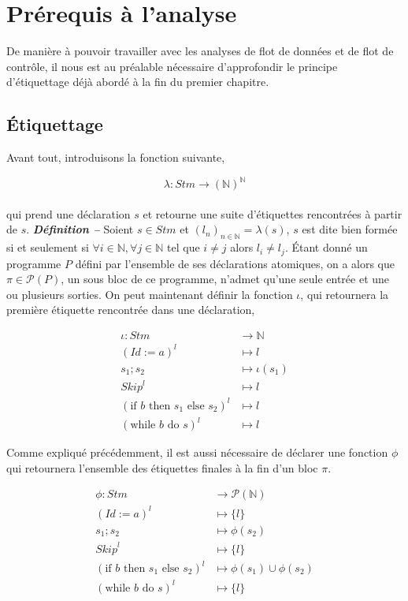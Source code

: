 \documentclass[a4paper, 12pt]{article}
\begin{document}
\section{Prérequis à l'analyse}
De manière à pouvoir travailler avec les analyses de flot de données et de flot de contrôle, 
il nous est au préalable nécessaire d'approfondir le principe d'étiquettage déjà abordé à la fin du premier chapitre.

\subsection{Étiquettage}
Avant tout, introduisons la fonction suivante,

$$\lambda: Stm \longrightarrow (\mathbb{N})^\mathbb{N}$$\\
qui prend une déclaration $s$ et retourne une suite d'étiquettes rencontrées à partir de $s$.
\newline
\newline
\textit{\textbf{Définition --}} Soient $s \in Stm$ et $(l_n)_{n\in\mathbb{N}}=\lambda(s)$, $s$ est dite bien formée si et seulement 
si $\forall i \in \mathbb{N}, \forall j \in \mathbb{N}$ tel que $i \ne j$ alors $l_i \ne l_j$.
\newline
\newline
Étant donné un programme $P$ défini par l'ensemble de ses déclarations atomiques, on a alors que 
$\pi \in \mathcal{P}(P)$, un sous bloc de ce programme, n'admet qu'une seule entrée et une ou plusieurs sorties. 
On peut maintenant définir la fonction $\iota$, qui retournera la première étiquette rencontrée dans une déclaration,

\begin{align*}
	\iota : Stm &\longrightarrow \mathbb{N}\\
	(Id:=a)^l &\longmapsto l\\
	s_1 ; s_2 &\longmapsto \iota(s_1)\\
	\textit{Skip}^l &\longmapsto l\\
	(\text{if }b\text{ then }s_1\text{ else }s_2)^l &\longmapsto l\\
	(\text{while }b\text{ do }s)^l &\longmapsto l
\end{align*}

Comme expliqué précédemment, il est aussi nécessaire de déclarer une fonction $\phi$ qui retournera l'ensemble des étiquettes finales 
à la fin d'un bloc $\pi$.

\begin{align*}
	\phi : Stm &\longrightarrow \mathcal{P}(\mathbb{N})\\
	(Id:=a)^l &\longmapsto \{l\}\\
	s_1 ; s_2 &\longmapsto \phi(s_2)\\
	\textit{Skip}^l &\longmapsto \{l\}\\
	(\text{if }b\text{ then }s_1\text{ else }s_2)^l &\longmapsto \phi(s_1) \cup \phi(s_2)\\
	(\text{while }b\text{ do }s)^l &\longmapsto \{l\}
\end{align*}
\end{document}
